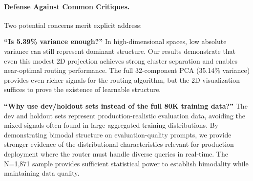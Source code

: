 \paragraph{Defense Against Common Critiques.} Two potential concerns merit explicit address:

\textbf{``Is 5.39\% variance enough?''} In high-dimensional spaces, low absolute variance can still 
represent dominant structure. Our results demonstrate that even this modest 2D projection achieves 
strong cluster separation and enables near-optimal routing performance. The full 32-component PCA 
(35.14\% variance) provides even richer signals for the routing algorithm, but the 2D visualization 
suffices to prove the existence of learnable structure.

\textbf{``Why use dev/holdout sets instead of the full 80K training data?''} The dev and holdout 
sets represent production-realistic evaluation data, avoiding the mixed signals often found in 
large aggregated training distributions. By demonstrating bimodal structure on evaluation-quality 
prompts, we provide stronger evidence of the distributional characteristics relevant for production 
deployment where the router must handle diverse queries in real-time. The N=1,871 sample provides 
sufficient statistical power to establish bimodality while maintaining data quality.

